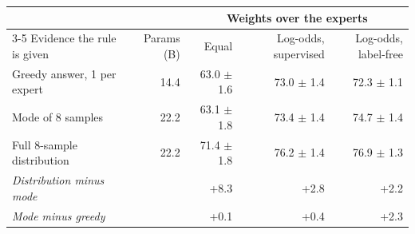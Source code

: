 \begin{tabular}{lrrrr}
\toprule
& & \multicolumn{3}{c}{Weights over the experts} \\
\cmidrule(lr){3-5}
Evidence the rule is given & Params (B) & Equal & Log-odds, supervised & Log-odds, label-free \\
\midrule
Greedy answer, 1 per expert & 14.4 & 63.0 $\pm$ 1.6 & 73.0 $\pm$ 1.4 & 72.3 $\pm$ 1.1 \\
Mode of 8 samples & 22.2 & 63.1 $\pm$ 1.8 & 73.4 $\pm$ 1.4 & 74.7 $\pm$ 1.4 \\
Full 8-sample distribution & 22.2 & 71.4 $\pm$ 1.8 & 76.2 $\pm$ 1.4 & 76.9 $\pm$ 1.3 \\
\midrule
\emph{Distribution minus mode} & & +8.3 & +2.8 & +2.2 \\
\emph{Mode minus greedy} & & +0.1 & +0.4 & +2.3 \\
\bottomrule
\end{tabular}
